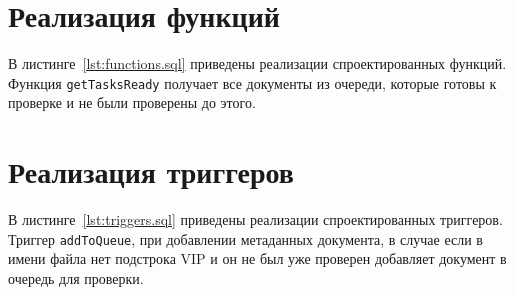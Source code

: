 \section{Реализация функций}
В листинге~\ref{lst:functions.sql} приведены реализации спроектированных функций. Функция \texttt{getTasksReady} получает все документы из очереди, которые готовы к проверке и не были проверены до этого.

\section{Реализация триггеров}
В листинге~\ref{lst:triggers.sql} приведены реализации спроектированных триггеров. Триггер \texttt{addToQueue}, при добавлении метаданных документа, в случае если в имени файла нет подстрока VIP и он не был уже проверен добавляет документ в очередь для проверки.

















